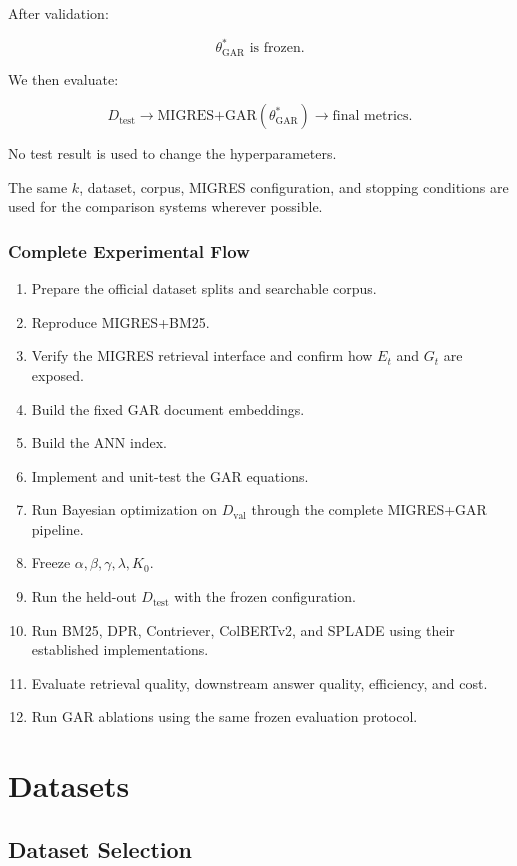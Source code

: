 \documentclass[11pt,a4paper]{article}
\begin{document}
After validation:

\[
\boxed{
\theta^*_{\mathrm{GAR}}
\text{ is frozen.}
}
\]

We then evaluate:

\[
D_{\mathrm{test}}
\rightarrow
\text{MIGRES+GAR}(\theta^*_{\mathrm{GAR}})
\rightarrow
\text{final metrics}.
\]

No test result is used to change the hyperparameters.

The same $k$, dataset, corpus, MIGRES configuration, and stopping conditions are used for the comparison systems wherever possible.

\subsubsection{Complete Experimental Flow}

\begin{enumerate}[leftmargin=1.5em]
\item Prepare the official dataset splits and searchable corpus.
\item Reproduce MIGRES+BM25.
\item Verify the MIGRES retrieval interface and confirm how $E_t$ and $G_t$ are exposed.
\item Build the fixed GAR document embeddings.
\item Build the ANN index.
\item Implement and unit-test the GAR equations.
\item Run Bayesian optimization on $D_{\mathrm{val}}$ through the complete MIGRES+GAR pipeline.
\item Freeze $\alpha,\beta,\gamma,\lambda,K_0$.
\item Run the held-out $D_{\mathrm{test}}$ with the frozen configuration.
\item Run BM25, DPR, Contriever, ColBERTv2, and SPLADE using their established implementations.
\item Evaluate retrieval quality, downstream answer quality, efficiency, and cost.
\item Run GAR ablations using the same frozen evaluation protocol.
\end{enumerate}

\section{Datasets}

\subsection{Dataset Selection}
\end{document}
